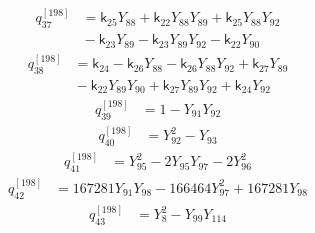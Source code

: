 \begin{equation}\label{q198:row:037}
\begin{aligned}
q_{37}^{[198]} &={} \mathsf{k}_{25}Y_{88} + \mathsf{k}_{22}Y_{88}Y_{89} + \mathsf{k}_{25}Y_{88}Y_{92}\\
&{} - \mathsf{k}_{23}Y_{89} - \mathsf{k}_{23}Y_{89}Y_{92} - \mathsf{k}_{22}Y_{90}
\end{aligned}
\end{equation}
\begin{equation}\label{q198:row:038}
\begin{aligned}
q_{38}^{[198]} &={} \mathsf{k}_{24} - \mathsf{k}_{26}Y_{88} - \mathsf{k}_{26}Y_{88}Y_{92} + \mathsf{k}_{27}Y_{89}\\
&{} - \mathsf{k}_{22}Y_{89}Y_{90} + \mathsf{k}_{27}Y_{89}Y_{92} + \mathsf{k}_{24}Y_{92}
\end{aligned}
\end{equation}
\begin{equation}\label{q198:row:039}
\begin{aligned}
q_{39}^{[198]} &={} 1 - Y_{91}Y_{92}
\end{aligned}
\end{equation}
\begin{equation}\label{q198:row:040}
\begin{aligned}
q_{40}^{[198]} &={} Y_{92}^{2} - Y_{93}
\end{aligned}
\end{equation}
\begin{equation}\label{q198:row:041}
\begin{aligned}
q_{41}^{[198]} &={} Y_{95}^{2} - 2Y_{95}Y_{97} - 2Y_{96}^{2}
\end{aligned}
\end{equation}
\begin{equation}\label{q198:row:042}
\begin{aligned}
q_{42}^{[198]} &={} 167281Y_{91}Y_{98} - 166464Y_{97}^{2} + 167281Y_{98}
\end{aligned}
\end{equation}
\begin{equation}\label{q198:row:043}
\begin{aligned}
q_{43}^{[198]} &={} Y_{8}^{2} - Y_{99}Y_{114}
\end{aligned}
\end{equation}
